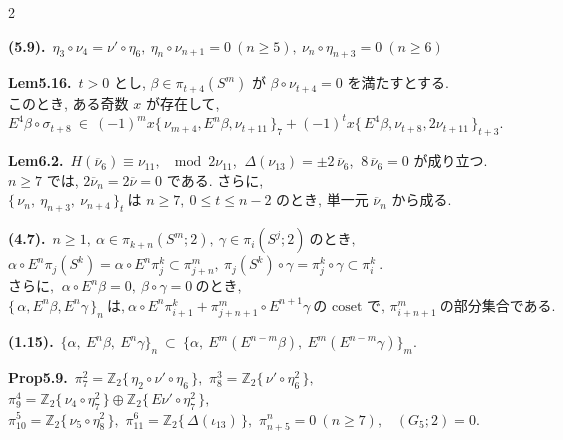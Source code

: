 \documentclass[10pt, leqno]{ltjsarticle}
\newcommand{\Ex}{E}        %
\newcommand{\todai}[2][]{\{\,#2\,\}_{#1}}      %
\newcommand{\gen}[1]{\{\,#1\,\}}       %
\newcommand{\pis}[2]{\pi_{#1}(#2)}       %
\newcommand{\pit}[2]{\pi_{#1}^{#2}}
\numberwithin{equation}{section}
\theoremstyle{plain}
\theoremstyle{definition}
\theoremstyle{remark}
\begin{document}
\begin{paracol}{2}
\switchcolumn

\noindent
\textbf{(5.9).}\
\(\eta_3\circ \nu_4= \nu'\circ \eta_6,\
\eta_n\circ \nu_{n+1}=0\ (n\ge5),\
\nu_n\circ \eta_{n+3}=0\ (n\ge6)\)

\noindent
\textbf{Lem5.16.}\
\(t>0\) とし, \(\beta\in\pi_{t+4}(S^{m})\) が 
\(\beta\circ \nu_{t+4}=0\) を満たすとする. \\
このとき, ある奇数 \(x\) が存在して,\\
\(
E^{4}\beta\circ \sigma_{t+8}\ \in\
(-1)^{m}x\todai[7]{\nu_{m+4}, E^{n}\beta, \nu_{t+11}}
+ (-1)^{t}x \todai[t+3]{E^{4}\beta, \nu_{t+8}, 2\nu_{t+11}}.
\)

\noindent
\textbf{Lem6.2.}\
\(H(\overline{\nu}_6)\equiv\nu_{11},\ \mod 2\nu_{11}\text{}\), 
\(\ \Delta(\nu_{13})=\pm 2\,\overline{\nu}_6\), 
\(\ 8\,\overline{\nu}_6=0\) が成り立つ. \\
\(n\ge7\) では,
\(2\overline{\nu}_n=2\overline{\nu}=0\) である. さらに,\\
\(
\todai[t]{\nu_n,\ \eta_{n+3},\ \nu_{n+4}}\ \text{は }n\ge7,\ 
0\le t\le n-2\text{ のとき, 単一元 }\overline{\nu}_n\text{ から成る. }
\)

\noindent
\textbf{(4.7).}\
\(n\ge1, \ \alpha\in\pis{k+n}{S^m; 2},\ \gamma\in\pis{i}{S^j; 2}
    \ \text{のとき, }\)\\
\(\alpha\circ E^n\pis{j}{S^k} = \alpha\circ E^n \pit{j}{k}
  \subset \pit{j+n}{m},
  \ \pis{j}{S^k}\circ\gamma = \pit{j}{k}\circ\gamma \subset\pit{i}{k}\ . \)\\
\(\text{さらに, }\ \alpha\circ E^n\beta=0,\ \beta\circ\gamma = 0 \ \text{のとき, }\)\\
\(\todai[n]{\alpha, E^n\beta, E^n\gamma}\ \text{は,}\
  \alpha\circ E^n\pit{i+1}{k} + \pit{j+n+1}{m}\circ E^{n+1}\gamma\
  \text{の coset で, }\pit{i+n+1}{m} \ \text{の部分集合である. }\)

\noindent
\textbf{(1.15).}\
\(\{\alpha,\ \Ex^n\beta,\ \Ex^n\gamma\}_n
\ \subset\
\bigl\{\alpha,\ \Ex^{m}(E^{n-m}\beta),\ E^{m}(E^{n-m}\gamma)\bigr\}_m .\)

\noindent
\textbf{Prop5.9.}\
\(\pi^{2}_{7}=\mathbb Z_2\gen{\eta_{2}\circ\nu'\circ\eta_6},\) \quad
\(\pi^{3}_{8}=\mathbb Z_2\gen{\nu'\circ\eta_6^2},\) \quad
\(\pi^{4}_{9}=\mathbb Z_2\gen{\nu_{4}\circ\eta_7^2}\oplus \mathbb Z_2\gen{E\nu'\circ\eta_7^2},\) \\
\(\pi^{5}_{10}=\mathbb Z_2\gen{\nu_{5}\circ\eta_8^2},\) \quad
\(\pi^{6}_{11}=\mathbb Z_2\gen{\Delta(\iota_{13})},\) \quad
\(\pi^{n}_{n+5}=0\ (n\ge7),\) \
\((G_{5};2)=0.\)


\end{paracol}
\end{document}
